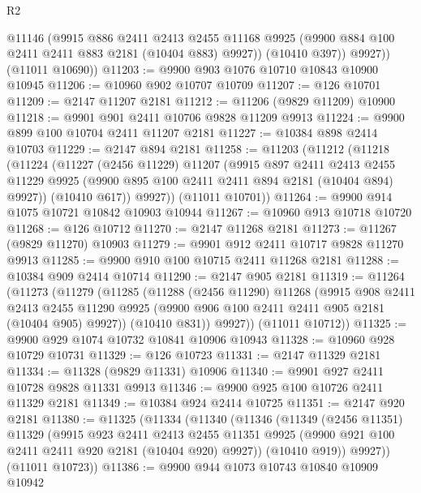 \begin{lexlean}{R2}
\begin{coremodule}
            @11146
            (@9915
              @886
              @2411
              @2413
              @2455
              @11168
              @9925
              (@9900 @884 @100 @2411 @2411 @883 @2181 (@10404 @883) @9927))
            (@10410 @397))
          @9927))
      (@11011 @10690))
@11203 := @9900 @903 @1076 @10710 @10843 @10900 @10945
@11206 := @10960 @902 @10707 @10709
@11207 := @126 @10701
@11209 := @2147 @11207 @2181
@11212 := @11206 (@9829 @11209) @10900
@11218 := @9901 @901 @2411 @10706 @9828 @11209 @9913
@11224 := @9900 @899 @100 @10704 @2411 @11207 @2181
@11227 := @10384 @898 @2414 @10703
@11229 := @2147 @894 @2181
@11258 := @11203
    (@11212
      (@11218
        (@11224
          (@11227
            (@2456 @11229)
            @11207
            (@9915
              @897
              @2411
              @2413
              @2455
              @11229
              @9925
              (@9900 @895 @100 @2411 @2411 @894 @2181 (@10404 @894) @9927))
            (@10410 @617))
          @9927))
      (@11011 @10701))
@11264 := @9900 @914 @1075 @10721 @10842 @10903 @10944
@11267 := @10960 @913 @10718 @10720
@11268 := @126 @10712
@11270 := @2147 @11268 @2181
@11273 := @11267 (@9829 @11270) @10903
@11279 := @9901 @912 @2411 @10717 @9828 @11270 @9913
@11285 := @9900 @910 @100 @10715 @2411 @11268 @2181
@11288 := @10384 @909 @2414 @10714
@11290 := @2147 @905 @2181
@11319 := @11264
    (@11273
      (@11279
        (@11285
          (@11288
            (@2456 @11290)
            @11268
            (@9915
              @908
              @2411
              @2413
              @2455
              @11290
              @9925
              (@9900 @906 @100 @2411 @2411 @905 @2181 (@10404 @905) @9927))
            (@10410 @831))
          @9927))
      (@11011 @10712))
@11325 := @9900 @929 @1074 @10732 @10841 @10906 @10943
@11328 := @10960 @928 @10729 @10731
@11329 := @126 @10723
@11331 := @2147 @11329 @2181
@11334 := @11328 (@9829 @11331) @10906
@11340 := @9901 @927 @2411 @10728 @9828 @11331 @9913
@11346 := @9900 @925 @100 @10726 @2411 @11329 @2181
@11349 := @10384 @924 @2414 @10725
@11351 := @2147 @920 @2181
@11380 := @11325
    (@11334
      (@11340
        (@11346
          (@11349
            (@2456 @11351)
            @11329
            (@9915
              @923
              @2411
              @2413
              @2455
              @11351
              @9925
              (@9900 @921 @100 @2411 @2411 @920 @2181 (@10404 @920) @9927))
            (@10410 @919))
          @9927))
      (@11011 @10723))
@11386 := @9900 @944 @1073 @10743 @10840 @10909 @10942

\end{coremodule}
\end{lexlean}
